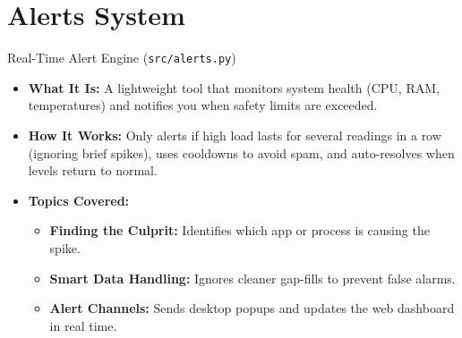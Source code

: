 \documentclass[aspectratio=169,10pt]{beamer}
\begin{document}
\section{Alerts System}

\begin{frame}{Real-Time Alert Engine (\texttt{src/alerts.py})}
    \begin{itemize}
        \setlength{\itemsep}{11pt}
        \item \textbf{What It Is:} A lightweight tool that monitors system health (CPU, RAM, temperatures) and notifies you when safety limits are exceeded.
        \item \textbf{How It Works:} Only alerts if high load lasts for several readings in a row (ignoring brief spikes), uses cooldowns to avoid spam, and auto-resolves when levels return to normal.
        \item \textbf{Topics Covered:}
        \begin{itemize}
            \setlength{\itemsep}{4pt}
            \item \textbf{Finding the Culprit:} Identifies which app or process is causing the spike.
            \item \textbf{Smart Data Handling:} Ignores cleaner gap-fills to prevent false alarms.
            \item \textbf{Alert Channels:} Sends desktop popups and updates the web dashboard in real time.
        \end{itemize}
    \end{itemize}
\end{frame}
\end{document}
